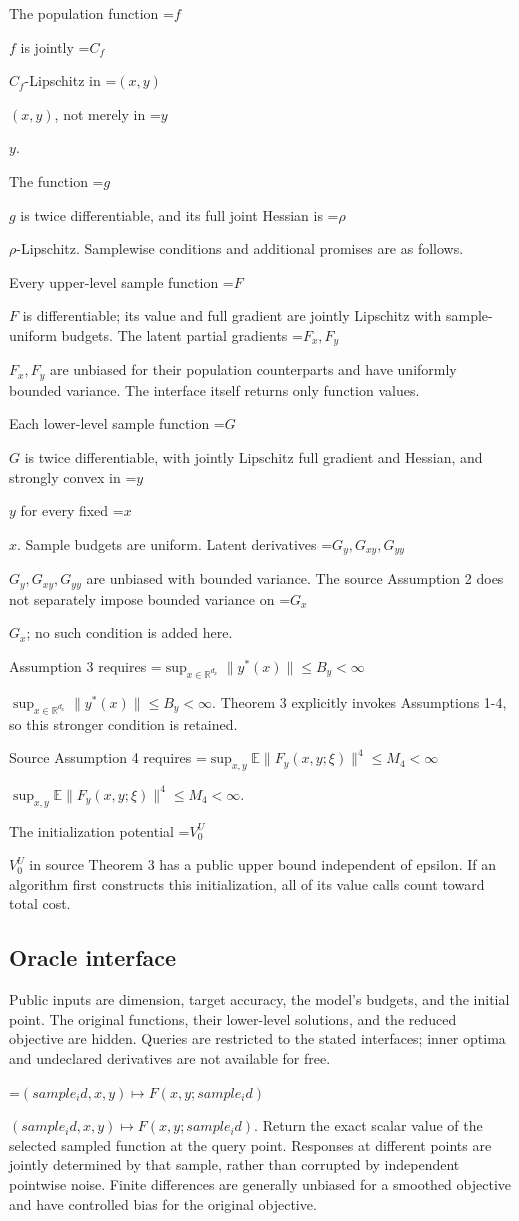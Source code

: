 \documentclass[10pt,a4paper]{article}
\newcommand{\AtlasMath}[1]{\par\begingroup\centering\setbox0=\hbox{$\displaystyle #1$}\ifdim\wd0>1.4\linewidth\typeout{ATLAS WIDE FORMULA: \the\wd0}\fi\ifdim\wd0>\linewidth\resizebox{\linewidth}{!}{\box0}\else\box0\fi\par\endgroup}
\newcommand{\AtlasInlineMath}[1]{\begingroup\setbox0=\hbox{$#1$}\ifdim\wd0>.4\linewidth\endgroup\AtlasMath{#1}\else\endgroup$#1$\fi}
\begin{document}
The population function \AtlasInlineMath{f} is jointly \AtlasInlineMath{C_f}-Lipschitz in \AtlasInlineMath{(x,y)}, not merely in \AtlasInlineMath{y}.

The function \AtlasInlineMath{g} is twice differentiable, and its full joint Hessian is \AtlasInlineMath{\rho}-Lipschitz. Samplewise conditions and additional promises are as follows.

Every upper-level sample function \AtlasInlineMath{F} is differentiable; its value and full gradient are jointly Lipschitz with sample-uniform budgets. The latent partial gradients \AtlasInlineMath{F_x,F_y} are unbiased for their population counterparts and have uniformly bounded variance. The interface itself returns only function values.

Each lower-level sample function \AtlasInlineMath{G} is twice differentiable, with jointly Lipschitz full gradient and Hessian, and strongly convex in \AtlasInlineMath{y} for every fixed \AtlasInlineMath{x}. Sample budgets are uniform. Latent derivatives \AtlasInlineMath{G_y,G_{xy},G_{yy}} are unbiased with bounded variance. The source Assumption 2 does not separately impose bounded variance on \AtlasInlineMath{G_x}; no such condition is added here.

Assumption 3 requires \AtlasInlineMath{\sup_{x\in\mathbb{R}^{d_x}}\|y^*(x)\|\le B_y<\infty}. Theorem 3 explicitly invokes Assumptions 1-4, so this stronger condition is retained.

Source Assumption 4 requires \AtlasInlineMath{\sup_{x,y}\mathbb{E}\|F_y(x,y;\xi)\|^4\le M_4<\infty}.

The initialization potential \AtlasInlineMath{V_0^U} in source Theorem 3 has a public upper bound independent of epsilon. If an algorithm first constructs this initialization, all of its value calls count toward total cost.

\subsection{Oracle interface}
Public inputs are dimension, target accuracy, the model's budgets, and the initial point. The original functions, their lower-level solutions, and the reduced objective are hidden. Queries are restricted to the stated interfaces; inner optima and undeclared derivatives are not available for free.

\AtlasInlineMath{(sample_id,x,y)\longmapsto F(x,y;sample_id)}. Return the exact scalar value of the selected sampled function at the query point. Responses at different points are jointly determined by that sample, rather than corrupted by independent pointwise noise. Finite differences are generally unbiased for a smoothed objective and have controlled bias for the original objective.
\end{document}
